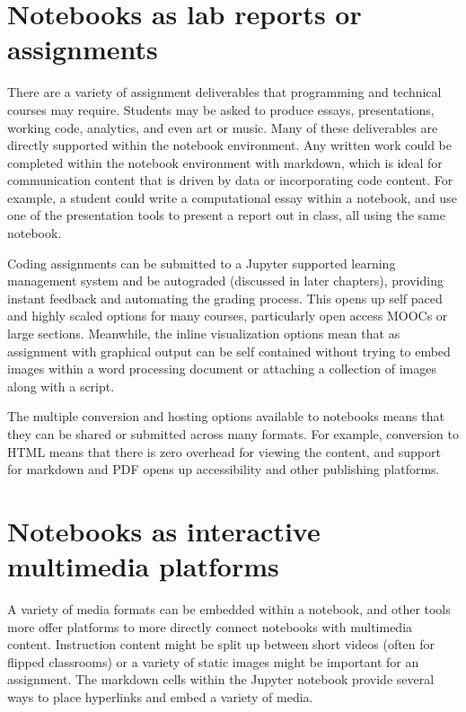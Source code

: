 \documentclass[]{book}
\begin{document}
\section{Notebooks as lab reports or
assignments}\label{notebooks-as-lab-reports-or-assignments}

There are a variety of assignment deliverables that programming and
technical courses may require. Students may be asked to produce essays,
presentations, working code, analytics, and even art or music. Many of
these deliverables are directly supported within the notebook
environment. Any written work could be completed within the notebook
environment with markdown, which is ideal for communication content that
is driven by data or incorporating code content. For example, a student
could write a computational essay within a notebook, and use one of the
presentation tools to present a report out in class, all using the same
notebook.

Coding assignments can be submitted to a Jupyter supported learning
management system and be autograded (discussed in later chapters),
providing instant feedback and automating the grading process. This
opens up self paced and highly scaled options for many courses,
particularly open access MOOCs or large sections. Meanwhile, the inline
visualization options mean that as assignment with graphical output can
be self contained without trying to embed images within a word
processing document or attaching a collection of images along with a
script.

The multiple conversion and hosting options available to notebooks means
that they can be shared or submitted across many formats. For example,
conversion to HTML means that there is zero overhead for viewing the
content, and support for markdown and PDF opens up accessibility and
other publishing platforms.

\section{Notebooks as interactive multimedia
platforms}\label{notebooks-as-interactive-multimedia-platforms}

A variety of media formats can be embedded within a notebook, and other
tools more offer platforms to more directly connect notebooks with
multimedia content. Instruction content might be split up between short
videos (often for flipped classrooms) or a variety of static images
might be important for an assignment. The markdown cells within the
Jupyter notebook provide several ways to place hyperlinks and embed a
variety of media.
\end{document}
